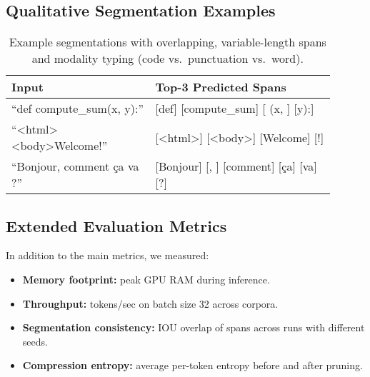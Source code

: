 \subsection{Qualitative Segmentation Examples}
\label{sec:qual-examples}

\begin{table}[H]
	\centering
	\begin{tabular}{@{}p{0.4\linewidth}p{0.5\linewidth}@{}}
		\toprule
		Input & Top-3 Predicted Spans \\
		\midrule
		“def compute_sum(x, y):” & [def] [compute\_sum] [ (x, ] [y):] \\
		“<html><body>Welcome!” & [<html>] [<body>] [Welcome] [!] \\
		“Bonjour, comment ça va ?” & [Bonjour] [, ] [comment] [ça] [va] [?] \\
		\bottomrule
	\end{tabular}
	\caption{Example segmentations with overlapping, variable-length spans and modality typing (code vs.\ punctuation vs.\ word).}
\end{table}

\subsection{Extended Evaluation Metrics}
\label{sec:extended-metrics}

In addition to the main metrics, we measured:
\begin{itemize}[leftmargin=1.5em]
	\item \textbf{Memory footprint:} peak GPU RAM during inference.
	\item \textbf{Throughput:} tokens/sec on batch size 32 across corpora.
	\item \textbf{Segmentation consistency:} IOU overlap of spans across runs with different seeds.
	\item \textbf{Compression entropy:} average per-token entropy before and after pruning.
\end{itemize}